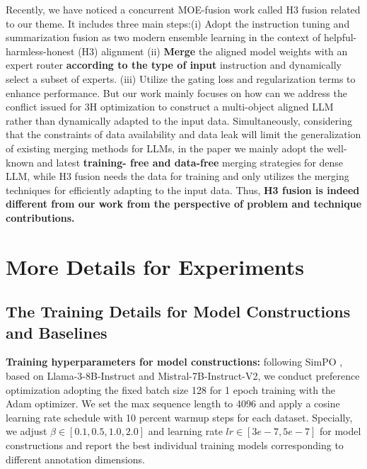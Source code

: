 Recently,  we have noticed a concurrent MOE-fusion work called H3 fusion \cite{tekin2024h} related to our theme. It includes three main steps:(i) Adopt the instruction tuning and summarization fusion as two modern ensemble learning in the context of helpful-harmless-honest (H3) alignment (ii) \textbf{Merge} the aligned model weights with an expert router \textbf{according to the type of
input} instruction and dynamically select a subset of experts. (iii) Utilize the gating loss and regularization terms to enhance performance. But our work mainly focuses on how can we address the conflict issued for 3H optimization to construct a multi-object aligned LLM rather than dynamically adapted to the input data. Simultaneously, considering that the constraints of data availability and data leak will limit the generalization of existing merging methods for LLMs, in the paper we mainly adopt the well-known and latest \textbf{training-
free and data-free} merging strategies for dense LLM, while H3 fusion needs the data for training and only utilizes the merging techniques for efficiently adapting to the input data. Thus, \textbf{H3 fusion is indeed different from our work from the perspective of problem and technique contributions.}



\section{More Details for Experiments}\label{training_details}
\subsection{The Training Details for Model Constructions and Baselines}
\textbf{Training hyperparameters for model constructions:} following SimPO \cite{meng2024simpo}, based on Llama-3-8B-Instruct and Mistral-7B-Instruct-V2, we conduct preference optimization adopting the fixed batch size 128 for 1 epoch training with the Adam optimizer. We set the max sequence length to 4096 and apply a cosine learning rate schedule with 10 percent warmup steps for each dataset. Specially, we adjust $\beta \in \left[ 0.1, 0.5, 1.0, 2.0 \right]$ and learning rate $lr \in \left[3e-7,5e-7 \right]$ for model constructions and report the best individual training models corresponding to different annotation dimensions.


